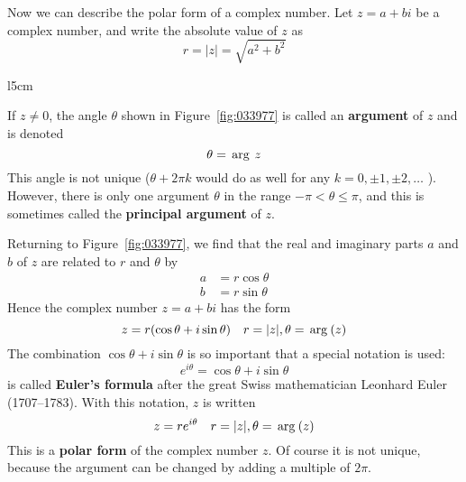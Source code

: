Now we can describe the polar form of a complex number. Let $z = a + bi$ be a complex number, and write the absolute value of $z$ as
\begin{equation*}
r = |z| = \sqrt{a^2+b^2}
\end{equation*}
\begin{wrapfigure}[9]{l}{5cm}
        \vspace*{-3em}
	\centering
	
	\caption{\label{fig:033977}}
\end{wrapfigure}
If $z \neq 0$, the angle $\theta$ shown in Figure~\ref{fig:033977} is called an \textbf{argument} of $z$ and is denoted
\begin{equation*}
\theta = \thinspace\operatorname{arg\medspace} z
\end{equation*} 
This angle is not unique ($\theta + 2\pi k$ would do as well for any \newline $k = 0, \pm 1, \pm 2, \dots$ ). However, there is only one argument $\theta$ in the range $-\pi < \theta \leq \pi$, and this is sometimes called the \textbf{principal argument} of $z$.

Returning to Figure~\ref{fig:033977}, we find that the real and imaginary parts $a$ and $b$ of $z$ are related to $r$ and $\theta$ by
\begin{align*}
a &= r \cos \theta \\
b &= r \sin \theta
\end{align*}
Hence the complex number $z = a + bi$ has the form
\begin{equation*}
z = r(\cos \theta + i \sin \theta) \quad r = |z|, \theta = \thinspace\operatorname{arg\medspace}(z)
\end{equation*}
The combination $\cos \theta + i \sin \theta$ is so important that a special notation is used:
\begin{equation*}
e^{i\theta} = \cos \theta + i \sin \theta
\end{equation*}
is called \textbf{Euler's formula} after the great Swiss mathematician Leonhard Euler (1707--1783). With this notation, $z$ is written
\begin{equation*}
z = r e^{i \theta} \quad r = |z|, \theta = \thinspace\operatorname{arg\medspace}(z)
\end{equation*}
This is a \textbf{polar form} of the complex number $z$. Of course it is not unique, because the argument can be changed by adding a multiple of $2\pi$.


